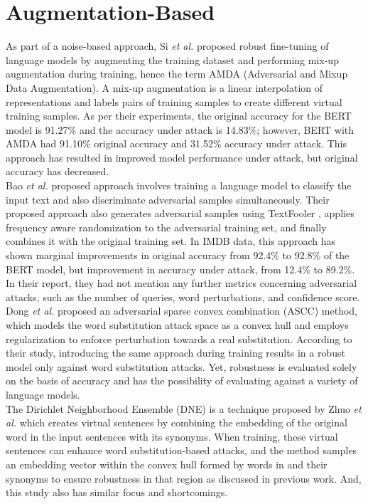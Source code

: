 \documentclass[%
	BCOR=8mm, %
	DIV=12,
	toc=bibliography, %
	toc=listof, %
	oneside, %
	egregdoesnotlikesansseriftitles, %
	]{scrbook}
\begin{document}
\section{Augmentation-Based}
As part of a noise-based approach, Si \textit{et al.} \cite{si_better_2021}  proposed robust fine-tuning of language models by augmenting the training dataset and performing mix-up augmentation during training, hence the term AMDA (Adversarial and Mixup Data Augmentation). A mix-up augmentation is a linear interpolation of representations and labels pairs of training samples to create different virtual training samples. As per their experiments, the original accuracy for the BERT model is 91.27\% and the accuracy under attack is 14.83\%; however, BERT with AMDA had 91.10\% original accuracy and 31.52\% accuracy under attack. This approach has resulted in improved model performance under attack, but original accuracy has decreased.\\
Bao \textit{et al.} \cite{bao_defending_2021} proposed approach involves training a language model to classify the input text and also discriminate adversarial samples simultaneously. Their proposed approach also generates adversarial samples using TextFooler \cite{jin_is_2020}, applies frequency aware randomization to the adversarial training set, and finally combines it with the original training set. In IMDB data, this approach has shown marginal improvements in original accuracy from 92.4\% to 92.8\% of the BERT model, but improvement in accuracy under attack, from 12.4\% to 89.2\%. In their report, they had not mention any further metrics concerning adversarial attacks, such as the number of queries, word perturbations, and confidence score.\\
Dong \textit{et al. }\cite{dong_towards_2021-2} proposed an adversarial sparse convex combination (ASCC) method, which models the word substitution attack space as a convex hull and employs regularization to enforce perturbation towards a real substitution. According to their study, introducing the same approach during training results in a robust model only against word substitution attacks. Yet, robustness is evaluated solely on the basis of accuracy and has the possibility of evaluating against a variety of language models. \\
The Dirichlet Neighborhood Ensemble (DNE) is a technique proposed by Zhuo \textit{et al.} \cite{zhou_defense_2020} which creates virtual sentences by combining the embedding of the original word in the input sentences with its synonyms. When training, these virtual sentences can enhance word substitution-based attacks, and the method samples an embedding vector within the convex hull formed by words in and their synonyms to ensure robustness in that region as discussed in previous work. And, this study also has similar focus and shortcomings.\\
\end{document}
